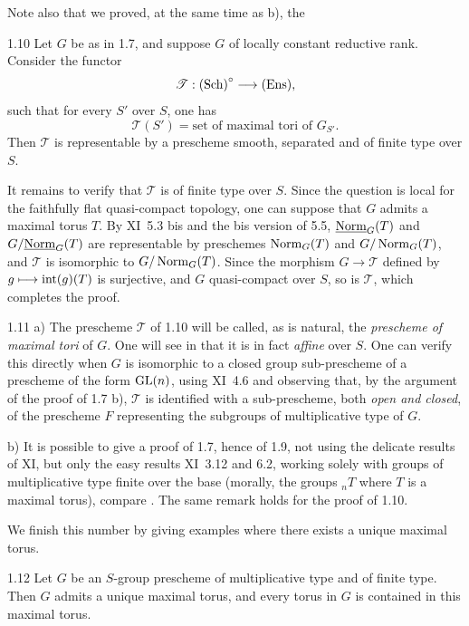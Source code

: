 Note also that we proved, at the same time as b), the
\begin{corollary}{1.10}\label{XII.1.10}
Let $G$ be as in 1.7, and suppose $G$ of locally constant reductive rank. Consider the functor
\[
\mathscr T:\textup{(Sch)}^\circ\longrightarrow\textup{(Ens)},
\]
such that for every $S'$ over $S$, one has
\[
\mathscr T(S')=\text{set of maximal tori of }G_{S'}.
\]
Then $\mathscr T$ is representable by a prescheme smooth, separated and of finite type over $S$.
\end{corollary}
It remains to verify that $\mathscr T$ is of finite type over $S$. Since the question is local for the faithfully flat quasi-compact topology, one can suppose that $G$ admits a maximal torus $T$. By XI~5.3 bis and the bis version of 5.5, $\underline{\mathrm{Norm}}_G(T)$ and $G/\underline{\mathrm{Norm}}_G(T)$ are representable by preschemes $\operatorname{Norm}_G(T)$ and $G/\operatorname{Norm}_G(T)$, and $\mathscr T$ is isomorphic to $G/\operatorname{Norm}_G(T)$. Since the morphism $G\to\mathscr T$ defined by $g\longmapsto\operatorname{int}(g)(T)$ is surjective, and $G$ quasi-compact over $S$, so is $\mathscr T$, which completes the proof.
\begin{remarks}{1.11}\label{XII.1.11}
a) The prescheme $\mathscr T$ of 1.10 will be called, as is natural, the \emph{prescheme of maximal tori} of $G$. One will see in  that it is in fact \emph{affine} over $S$. One can verify this directly when $G$ is isomorphic to a closed group sub-prescheme of a prescheme of the form $\operatorname{GL}(n)$, using XI~4.6 and observing that, by the argument of the proof of 1.7 b), $\mathscr T$ is identified with a sub-prescheme, both \emph{open and closed}, of the prescheme $F$ representing the subgroups of multiplicative type of $G$.

b) It is possible to give a proof of 1.7, hence of 1.9, not using the delicate results of XI, but only the easy results XI~3.12 and 6.2, working solely with groups of multiplicative type finite over the base (morally, the groups ${}_nT$ where $T$ is a maximal torus), compare . The same remark holds for the proof of 1.10.
\end{remarks}

We finish this number by giving examples where there exists a unique maximal torus.
\begin{proposition}{1.12}\label{XII.1.12}
Let $G$ be an $S$-group prescheme of multiplicative type and of finite type. Then $G$ admits a unique maximal torus, and every torus in $G$ is contained in this maximal torus.
\end{proposition}
